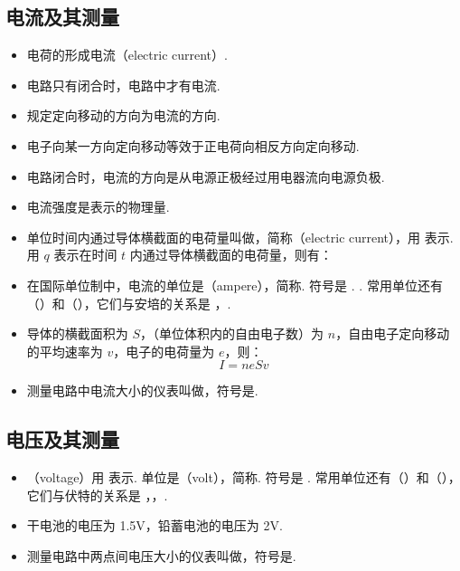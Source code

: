 \subsection{电流及其测量}
\begin{itemize}
\item 电荷的形成电流（electric current）.
\item 电路只有闭合时，电路中才有电流.
\item 规定定向移动的方向为电流的方向.
\item 电子向某一方向定向移动等效于正电荷向相反方向定向移动.
\item 电路闭合时，电流的方向是从电源正极经过用电器流向电源负极.
\item 电流强度是表示的物理量.
\item 单位时间内通过导体横截面的电荷量叫做，简称（electric current），用  表示. 用 $q$ 表示在时间 $t$ 内通过导体横截面的电荷量，则有：
\item 在国际单位制中，电流的单位是（ampere），简称. 符号是 . . 常用单位还有（）和（），它们与安培的关系是 ，.
\item 导体的横截面积为 $S$，（单位体积内的自由电子数）为 $n$，自由电子定向移动的平均速率为 $v$，电子的电荷量为 $e$，则：
$$
I=neSv
$$
\item 测量电路中电流大小的仪表叫做，符号是\ammeter.
\end{itemize}

\subsection{电压及其测量}
\begin{itemize}
\item {}（voltage）用  表示. 单位是（volt），简称. 符号是 . 常用单位还有（）和（），它们与伏特的关系是 ，，.
\item 干电池的电压为 1.5V，铅蓄电池的电压为 2V.
\item 测量电路中两点间电压大小的仪表叫做，符号是\voltmeter.
\end{itemize}

